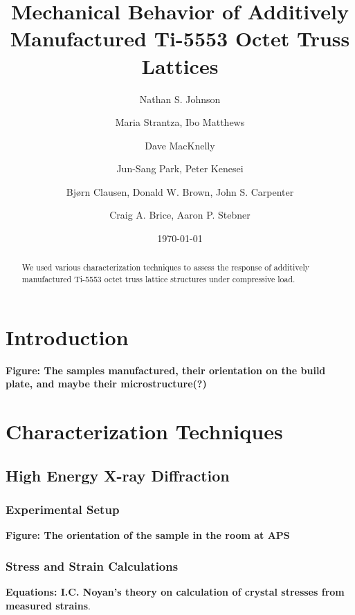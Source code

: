 \documentclass[twocolumn,nofootinbib]{revtex4-1}
\begin{document}
\title{Mechanical Behavior of Additively Manufactured Ti-5553 Octet Truss Lattices}
\author{Nathan S. Johnson}

\author{Maria Strantza, Ibo Matthews}

\author{Dave MacKnelly}

\author{Jun-Sang Park, Peter Kenesei}

\author{Bj\o rn Clausen, Donald W. Brown, John S. Carpenter}

\author{Craig A. Brice, Aaron P. Stebner}

\begin{abstract}
We used various characterization techniques to assess the response of additively manufactured Ti-5553 octet truss lattice structures under compressive load.
\end{abstract}
\date{\today}
\maketitle

\section{Introduction}
\textbf{Figure: The samples manufactured, their orientation on the build plate, and maybe their microstructure(?)}

\section{Characterization Techniques}

\subsection{High Energy X-ray Diffraction}
\subsubsection{Experimental Setup}
\textbf{Figure: The orientation of the sample in the room at APS}
\subsubsection{Stress and Strain Calculations}
\textbf{Equations: I.C. Noyan's theory on calculation of crystal stresses from measured strains}.
\end{document}

